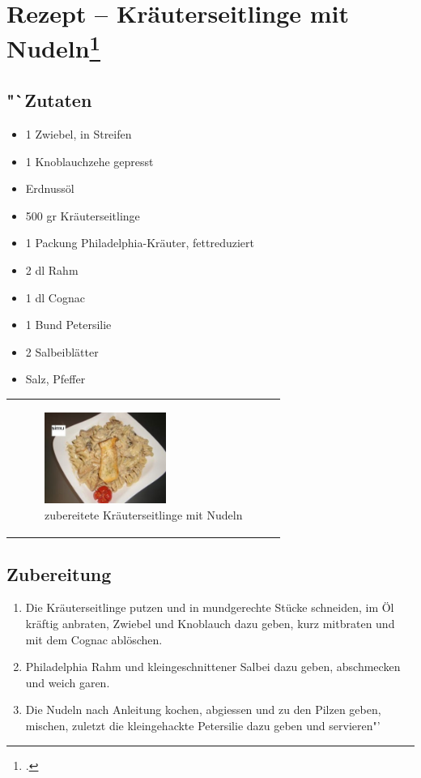 \documentclass[a4paper,abstracton]{scrreprt}
\begin{document}
\section[Rezept -- Kräuterseitlinge mit Nudeln]{Rezept -- Kräuterseitlinge mit Nudeln\footcite{rezept}}

\begin{minipage}{0.45\textwidth}

\subsection[Zutaten]{"`Zutaten}
\begin{itemize}
\item 1 Zwiebel, in Streifen
\item 1 Knoblauchzehe gepresst
\item Erdnussöl
\item 500 gr Kräuterseitlinge
\item 1 Packung Philadelphia-Kräuter, fettreduziert
\item 2 dl Rahm
\item 1 dl Cognac
\item 1 Bund Petersilie
\item 2 Salbeiblätter
\item Salz, Pfeffer
\end{itemize}
\end{minipage}%
\begin{minipage}{0.45\textwidth}
\begin{tabular}{p{\textwidth}}

\begin{figure}[H]
\centering
\includegraphics[width=150px]{rezept}
\caption[zubereitete Kräuterseitlinge mit Nudeln]{zubereitete Kräuterseitlinge mit Nudeln\protect\footnotemark}
\label{fig:rezept}
\end{figure}

\end{tabular}
\end{minipage}%

\subsection{Zubereitung}
\begin{enumerate}
\item Die Kräuterseitlinge putzen und in mundgerechte Stücke schneiden, im Öl kräftig anbraten, Zwiebel und Knoblauch dazu geben, kurz mitbraten und mit dem Cognac ablöschen.
\item Philadelphia Rahm und kleingeschnittener Salbei dazu geben, abschmecken und weich garen.
\item Die Nudeln nach Anleitung kochen, abgiessen und zu den Pilzen geben, mischen, zuletzt die kleingehackte Petersilie dazu geben und servieren"'
\end{enumerate}

\printbibliography[heading=lit]
\end{document}
